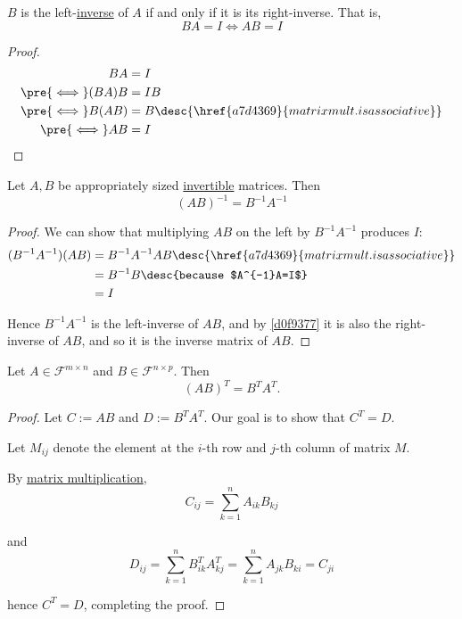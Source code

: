 \label{d0f9377}

$B$ is the left-\href{ce4daa8}{inverse} of $A$ if and only if it is its
right-inverse. That is,
$$
  BA=I\iff AB=I
$$

\begin{proof}
  \begin{align*}
    BA               &=I                                                   \\
    \pre{\iff} (BA)B &=IB                                                  \\
    \pre{\iff} B(AB) &=B\desc{\href{a7d4369}{matrix mult. is associative}} \\
    \pre{\iff} AB    &=I
  \end{align*}
\end{proof}

\label{d857d76}

Let $A,B$ be appropriately sized \href{ce4daa8}{invertible} matrices. Then
$$
  (AB)^{-1}=B^{-1}A^{-1}
$$

\begin{proof}
  We can show that multiplying $AB$ on the left by $B^{-1}A^{-1}$ produces $I$:
  \begin{align*}
    (B^{-1}A^{-1})(AB) &=B^{-1}A^{-1}AB\desc{\href{a7d4369}{matrix mult. is associative}} \\
                       &=B^{-1}B\desc{because $A^{-1}A=I$}                                \\
                       &=I
  \end{align*}

  Hence $B^{-1}A^{-1}$ is the left-inverse of $AB$, and by \autoref{d0f9377} it
  is also the right-inverse of $AB$, and so it is the inverse matrix of $AB$.
\end{proof}

\label{e8b98fd}

Let $A\in\mathcal F^{m\times n}$ and $B\in\mathcal F^{n\times p}$. Then
$$
  (AB)^T=B^TA^T.
$$

\begin{proof}
  Let $C:=AB$ and $D:=B^TA^T$. Our goal is to show that $C^T=D$.

  Let $M_{ij}$ denote the element at the $i$-th row and $j$-th column of matrix
  $M$.

  By \href{d786633}{matrix multiplication},
  \begin{equation*}
    C_{ij}=\sum_{k=1}^nA_{ik}B_{kj}
  \end{equation*}

  and
  \begin{equation*}
    D_{ij} =\sum_{k=1}^nB^T_{ik}A^T_{kj}
    =\sum_{k=1}^nA_{jk}B_{ki}
    = C_{ji}
  \end{equation*}

  hence $C^T=D$, completing the proof.
\end{proof}
